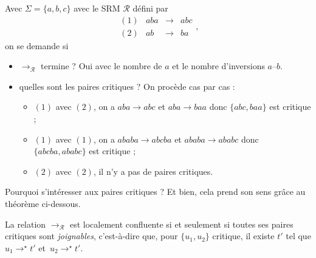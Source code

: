 \documentclass[../main]{subfiles}
\begin{document}
  \begin{exm}
    Avec $\Sigma = \{a,b,c\}$ avec le SRM $\mathcal{R}$ défini par \[
    \begin{array}{crcl}
      (1)&aba&\to&abc\\
      (2)&ab&\to&ba
    \end{array}
    ,\]
    on se demande si 
    \begin{itemize}
      \item $\to_\mathcal{R}$ termine ? Oui avec  le nombre de $a$ et le nombre d'inversions $a$--$b$.
      \item quelles sont les paires critiques ?
        On procède cas par cas :
        \begin{itemize}
          \item $(1)$ avec $(2)$, on a $aba \to abc$ et $aba \to baa$ donc $\{abc, baa\}$ est critique ;
          \item $(1)$ avec $(1)$, on a $ababa \to abcba$ et $ababa \to ababc$ donc $\{abcba, ababc\}$ est critique ;
          \item $(2)$ avec $(2)$, il n'y a pas de paires critiques.
        \end{itemize}
    \end{itemize}
  \end{exm}


  Pourquoi s'intéresser aux paires critiques ? Et bien, cela prend son sens grâce au théorème ci-dessous.
  \begin{thm}
    La relation $\to_\mathcal{R}$ est localement confluente si et seulement si toutes ses paires critiques sont \textit{joignables}, c'est-à-dire que, pour $\{u_1,u_2\}$ critique, il existe $t'$ tel que $u_1 \to^\star t'$ et~$u_2 \to^\star t'$.
  \end{thm}
\end{document}
